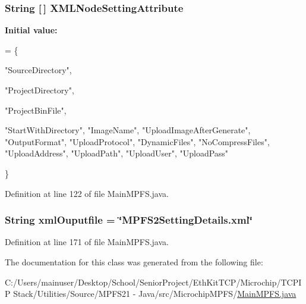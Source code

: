 \subsubsection[{X\+M\+L\+Node\+Setting\+Attribute}]{\setlength{\rightskip}{0pt plus 5cm}String \mbox{[}$\,$\mbox{]} X\+M\+L\+Node\+Setting\+Attribute}\label{class_microchip_m_p_f_s_1_1_main_m_p_f_s_a284bebc3990bf874495c63942e6d2584}
{\bfseries Initial value\+:}
\begin{DoxyCode}
=
    \{
    
        \textcolor{stringliteral}{"SourceDirectory"},
   
   
        \textcolor{stringliteral}{"ProjectDirectory"},
   
   
        \textcolor{stringliteral}{"ProjectBinFile"},
   
        \textcolor{stringliteral}{"StartWithDirectory"},
        \textcolor{stringliteral}{"ImageName"},
        \textcolor{stringliteral}{"UploadImageAfterGenerate"},
        \textcolor{stringliteral}{"OutputFormat"},
        \textcolor{stringliteral}{"UploadProtocol"},
        \textcolor{stringliteral}{"DynamicFiles"},
        \textcolor{stringliteral}{"NoCompressFiles"},
        \textcolor{stringliteral}{"UploadAddress"},
        \textcolor{stringliteral}{"UploadPath"},
        \textcolor{stringliteral}{"UploadUser"},
        \textcolor{stringliteral}{"UploadPass"}

    \}
\end{DoxyCode}


Definition at line 122 of file Main\+M\+P\+F\+S.\+java.

\hypertarget{class_microchip_m_p_f_s_1_1_main_m_p_f_s_a886bb4502d02da005ccbe15c23a80d72}{}
\subsubsection[{xml\+Ouputfile}]{\setlength{\rightskip}{0pt plus 5cm}String xml\+Ouputfile = \char`\"{}M\+P\+F\+S2\+Setting\+Details.\+xml\char`\"{}}\label{class_microchip_m_p_f_s_1_1_main_m_p_f_s_a886bb4502d02da005ccbe15c23a80d72}


Definition at line 171 of file Main\+M\+P\+F\+S.\+java.



The documentation for this class was generated from the following file\+:\begin{DoxyCompactItemize}
\item 
C\+:/\+Users/mainuser/\+Desktop/\+School/\+Senior\+Project/\+Eth\+Kit\+T\+C\+P/\+Microchip/\+T\+C\+P\+I\+P Stack/\+Utilities/\+Source/\+M\+P\+F\+S21 -\/ Java/src/\+Microchip\+M\+P\+F\+S/\hyperlink{_main_m_p_f_s_8java}{Main\+M\+P\+F\+S.\+java}\end{DoxyCompactItemize}
